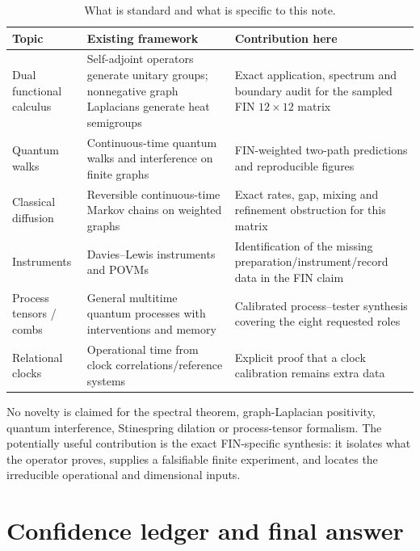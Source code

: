 \documentclass[11pt,a4paper]{article}
\theoremstyle{definition}
\theoremstyle{remark}
\begin{document}
\begin{table}[H]
\centering
\caption{What is standard and what is specific to this note.}
\begin{tabularx}{\textwidth}{@{}lXX@{}}
\toprule
Topic & Existing framework & Contribution here\\
\midrule
Dual functional calculus & Self-adjoint operators generate unitary groups; nonnegative graph Laplacians generate heat semigroups & Exact application, spectrum and boundary audit for the sampled FIN $12\times12$ matrix\\
Quantum walks & Continuous-time quantum walks and interference on finite graphs & FIN-weighted two-path predictions and reproducible figures\\
Classical diffusion & Reversible continuous-time Markov chains on weighted graphs & Exact rates, gap, mixing and refinement obstruction for this matrix\\
Instruments & Davies--Lewis instruments and POVMs & Identification of the missing preparation/instrument/record data in the FIN claim\\
Process tensors / combs & General multitime quantum processes with interventions and memory & Calibrated process--tester synthesis covering the eight requested roles\\
Relational clocks & Operational time from clock correlations/reference systems & Explicit proof that a clock calibration remains extra data\\
\bottomrule
\end{tabularx}
\end{table}

No novelty is claimed for the spectral theorem, graph-Laplacian positivity, quantum interference, Stinespring dilation or process-tensor formalism. The potentially useful contribution is the exact FIN-specific synthesis: it isolates what the operator proves, supplies a falsifiable finite experiment, and locates the irreducible operational and dimensional inputs.

\section{Confidence ledger and final answer}
\end{document}
